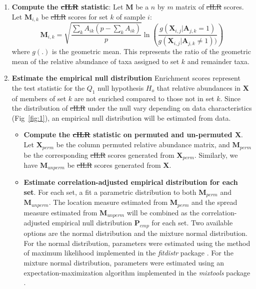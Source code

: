 \documentclass[10pt,letterpaper]{article}
\providecommand{\DIFaddtex}[1]{{\protect\color{blue}\uwave{#1}}} %
\providecommand{\DIFdeltex}[1]{{\protect\color{red}\sout{#1}}}                      %
\providecommand{\DIFaddbegin}{} %
\providecommand{\DIFaddend}{} %
\providecommand{\DIFdelbegin}{} %
\providecommand{\DIFdelend}{} %
\providecommand{\DIFadd}[1]{\texorpdfstring{\DIFaddtex{#1}}{#1}} %
\providecommand{\DIFdel}[1]{\texorpdfstring{\DIFdeltex{#1}}{}} %
\newcommand{\DIFscaledelfig}{0.5}
\newlength{\DIFdelgraphicswidth} %
\newlength{\DIFdelgraphicsheight} %
\newcommand{\DIFaddincludegraphics}[2][]{{\color{blue}\fbox{\DIFOincludegraphics[#1]{#2}}}} %
\newcommand{\DIFdelincludegraphics}[2][]{%
\sbox{\DIFdelgraphicsbox}{\DIFOincludegraphics[#1]{#2}}%
\settoboxwidth{\DIFdelgraphicswidth}{\DIFdelgraphicsbox} %
\settoboxtotalheight{\DIFdelgraphicsheight}{\DIFdelgraphicsbox} %
\scalebox{\DIFscaledelfig}{%
\parbox[b]{\DIFdelgraphicswidth}{\usebox{\DIFdelgraphicsbox}\\[-\baselineskip] \rule{\DIFdelgraphicswidth}{0em}}\llap{\resizebox{\DIFdelgraphicswidth}{\DIFdelgraphicsheight}{%
\setlength{\unitlength}{\DIFdelgraphicswidth}%
\begin{picture}(1,1)%
\thicklines\linethickness{2pt} %
{\color[rgb]{1,0,0}\put(0,0){\framebox(1,1){}}}%
{\color[rgb]{1,0,0}\put(0,0){\line( 1,1){1}}}%
{\color[rgb]{1,0,0}\put(0,1){\line(1,-1){1}}}%
\end{picture}%
}\hspace*{3pt}}} %
} %
\DeclareRobustCommand{\DIFaddbegin}{\DIFOaddbegin \let\includegraphics\DIFaddincludegraphics} %
\DeclareRobustCommand{\DIFaddend}{\DIFOaddend \let\includegraphics\DIFOincludegraphics} %
\DeclareRobustCommand{\DIFdelbegin}{\DIFOdelbegin \let\includegraphics\DIFdelincludegraphics} %
\DeclareRobustCommand{\DIFdelend}{\DIFOaddend \let\includegraphics\DIFOincludegraphics} %
\begin{document}
\begin{enumerate}
    \item \textbf{Compute the \DIFdelbegin \DIFdel{cILR }\DIFdelend \DIFaddbegin \DIFadd{CBEA }\DIFaddend statistic}: Let $\mathbf{M}$ be a $n$ by $m$ matrix of \DIFdelbegin \DIFdel{cILR }\DIFdelend \DIFaddbegin \DIFadd{CBEA }\DIFaddend scores. Let $\mathbf{M}_{i,k}$ be \DIFdelbegin \DIFdel{cILR }\DIFdelend \DIFaddbegin \DIFadd{CBEA }\DIFaddend scores for set $k$ of sample $i$:   
    \begin{equation}\label{main_eq}
        \mathbf{M}_{i,k} = \sqrt{\frac{\sum_k A_{ik}(p - \sum_k A_{ik})}{p}} \ln \left( \frac{g(\mathbf{X}_{i,j}|\mathbf{A}_{j,k} = 1)}{g(\mathbf{X}_{i,j}|\mathbf{A}_{j,k} \neq 1))} \right)
    \end{equation}
    where $g(.)$ is the geometric mean. This represents the ratio of the geometric mean of the relative abundance of taxa assigned to set $k$ and remainder taxa. 
    \item \textbf{Estimate the empirical null distribution} Enrichment scores represent the test statistic for the $Q_1$ null hypothesis $H_o$ that relative abundances in $\mathbf{X}$ of members of set $k$ are not enriched compared to those not in set $k$. Since the distribution of \DIFdelbegin \DIFdel{cILR }\DIFdelend \DIFaddbegin \DIFadd{CBEA }\DIFaddend under the null vary depending on data characteristics (Fig~\ref{fig:1}), an empirical null distribution will be estimated from data.
    \begin{itemize}
        \item \textbf{Compute the \DIFdelbegin \DIFdel{cILR }\DIFdelend \DIFaddbegin \DIFadd{CBEA }\DIFaddend statistic on permuted and un-permuted $\mathbf{X}$}.  Let $\mathbf{X}_{perm}$ be the column permuted relative abundance matrix, and $\mathbf{M}_{perm}$ be the corresponding \DIFdelbegin \DIFdel{cILR }\DIFdelend \DIFaddbegin \DIFadd{CBEA }\DIFaddend scores generated from $\mathbf{X}_{perm}$. Similarly, we have $\mathbf{M}_{unperm}$ be \DIFdelbegin \DIFdel{cILR }\DIFdelend \DIFaddbegin \DIFadd{CBEA }\DIFaddend scores generated from $\mathbf{X}$.
        \item \textbf{Estimate correlation-adjusted empirical distribution for each set}. For each set, a fit a parametric distribution to both $\mathbf{M}_{perm}$ and $\mathbf{M}_{unperm}$. The location measure estimated from $\mathbf{M}_{perm}$ and the spread measure estimated from $\mathbf{M}_{unperm}$ will be combined as the correlation-adjusted empirical null distribution $\mathbf{P}_{emp}$ for each set. Two available options are the normal distribution and the mixture normal distribution. For the normal distribution, parameters were estimated using the method of maximum likelihood implemented in the \emph{fitdistr} package \cite{delignette-muller2015}. For the mixture normal distribution, parameters were estimated using an expectation-maximization algorithm implemented in the \emph{mixtools} package \cite{benaglia2009}. 

\end{itemize}
\end{enumerate}
\end{document}
